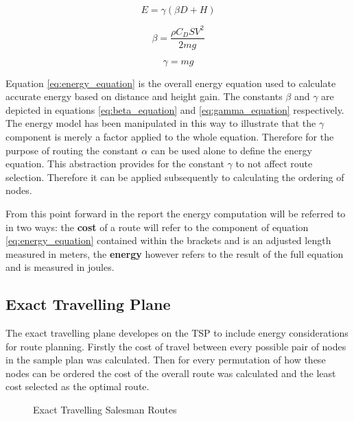 \documentclass[a4paper,12pt,twoside]{article}
\begin{document}
\begin{equation}
\label{eq:energy_equation}
E =\gamma(\beta D + H)
\end{equation}

\begin{equation}
\label{eq:beta_equation}
\beta = \frac{\rho C_D S V^2}{2mg}
\end{equation}

\begin{equation}
\label{eq:gamma_equation}
\gamma = mg
\end{equation}

Equation \ref{eq:energy_equation} is the overall energy equation used to calculate accurate energy based on distance and height gain. The constants $\beta$ and $\gamma$ are depicted in equations \ref{eq:beta_equation} and \ref{eq:gamma_equation} respectively. The energy model has been manipulated in this way to illustrate that the $\gamma$ component is merely a factor applied to the whole equation. Therefore for the purpose of routing the constant $\alpha$ can be used alone to define the energy equation. This abstraction provides for the constant $\gamma$ to not affect route selection. Therefore it can be applied subsequently to calculating the ordering of nodes.

From this point forward in the report the energy computation will be referred to in two ways: the \textbf{cost} of a route will refer to the component of equation \ref{eq:energy_equation} contained within the brackets and is an adjusted length measured in meters, the \textbf{energy} however refers to the result of the full equation and is measured in joules.

\subsection{Exact Travelling Plane}
\label{sec:exact_travelling_plane}

The exact travelling plane developes on the TSP to include energy considerations for route planning. Firstly the cost of travel between every possible pair of nodes in the sample plan was calculated. Then for every permutation of how these nodes can be ordered the cost of the overall route was calculated and the least cost selected as the optimal route.

\begin{figure}
	\centering
	
	\caption{Exact Travelling Salesman Routes}
	\label{fig:exact_travelling_salesman_routes}
\end{figure}
\end{document}
